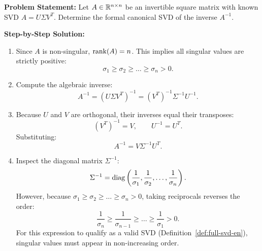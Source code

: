 \begin{example}
\textbf{Problem Statement:} Let $A \in \mathbb{R}^{n \times n}$ be an invertible square matrix with known SVD $A = U \Sigma V^T$. Determine the formal canonical SVD of the inverse $A^{-1}$.

\medskip
\textbf{Step-by-Step Solution:}
\begin{enumerate}
    \item Since $A$ is non-singular, $\operatorname{rank}(A) = n$. This implies all singular values are strictly positive:
    \begin{equation}
        \sigma_1 \ge \sigma_2 \ge \dots \ge \sigma_n > 0.
    \end{equation}
    \item Compute the algebraic inverse:
    \begin{equation}
        A^{-1} = (U \Sigma V^T)^{-1} = (V^T)^{-1} \Sigma^{-1} U^{-1}.
    \end{equation}
    \item Because $U$ and $V$ are orthogonal, their inverses equal their transposes:
    \begin{equation}
        (V^T)^{-1} = V, \qquad U^{-1} = U^T.
    \end{equation}
    Substituting:
    \begin{equation}
        A^{-1} = V \Sigma^{-1} U^T.
    \end{equation}
    \item Inspect the diagonal matrix $\Sigma^{-1}$:
    \begin{equation}
        \Sigma^{-1} = \operatorname{diag}\left(\frac{1}{\sigma_1}, \frac{1}{\sigma_2}, \dots, \frac{1}{\sigma_n}\right).
    \end{equation}
    However, because $\sigma_1 \ge \sigma_2 \ge \dots \ge \sigma_n > 0$, taking reciprocals reverses the order:
    \begin{equation}
        \frac{1}{\sigma_n} \ge \frac{1}{\sigma_{n-1}} \ge \dots \ge \frac{1}{\sigma_1} > 0.
    \end{equation}
    For this expression to qualify as a valid SVD (Definition~\ref{def:full-svd-en}), singular values must appear in non-increasing order.


\end{enumerate}
\end{example}
